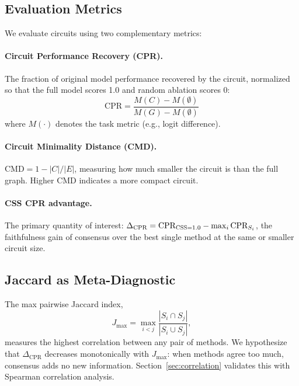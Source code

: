\documentclass[11pt,a4paper]{article}
\newcommand{\css}{\textsc{CSS}}
\newcommand{\cpr}{\text{CPR}}
\newcommand{\cmd}{\text{CMD}}
\begin{document}
\subsection{Evaluation Metrics}
We evaluate circuits using two complementary metrics:

\paragraph{Circuit Performance Recovery (CPR).}
The fraction of original model performance recovered by the circuit, normalized so that the full model scores 1.0 and random ablation scores 0:
\begin{equation}
    \cpr = \frac{M(C) - M(\emptyset)}{M(G) - M(\emptyset)}
\end{equation}
where $M(\cdot)$ denotes the task metric (e.g., logit difference).

\paragraph{Circuit Minimality Distance (CMD).}
$\cmd = 1 - |C|/|E|$, measuring how much smaller the circuit is than the full graph.
Higher CMD indicates a more compact circuit.

\paragraph{CSS CPR advantage.}
The primary quantity of interest: $\Delta_{\cpr} = \cpr_{\css=1.0} - \max_i \cpr_{S_i}$, the faithfulness gain of consensus over the best single method at the same or smaller circuit size.

\subsection{Jaccard as Meta-Diagnostic}
\label{sec:jaccard_diagnostic}
The max pairwise Jaccard index,
\begin{equation}
    J_{\max} = \max_{i < j} \frac{|S_i \cap S_j|}{|S_i \cup S_j|},
\end{equation}
measures the highest correlation between any pair of methods.
We hypothesize that $\Delta_{\cpr}$ decreases monotonically with $J_{\max}$: when methods agree too much, consensus adds no new information.
Section~\ref{sec:correlation} validates this with Spearman correlation analysis.

\end{document}
